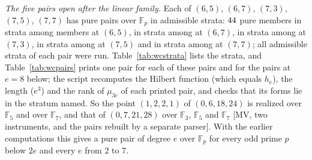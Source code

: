 \documentclass[11pt]{article}
\theoremstyle{definition}
\theoremstyle{remark}
\newcommand{\F}{\mathbb{F}}
\begin{document}
\begin{table}[htbp]
\centering\scriptsize

\caption{The search in the weight-class strata: family C (controls on settled pairs), Q (the five open pairs $(6,5)$, $(6,7)$, $(7,3)$, $(7,5)$, $(7,7)$) and E ($e=8$, exploratory); for each pair the number of strata stored, with a member of rank $r$ and with a pure member, the members examined, with $\operatorname{rank}\mu_{3e}=r$, with the pure Hilbert function, the Betti tables computed and the pure ones, and the share of the pure Hilbert function in $S(2;0,1)$ (the number of such members among the members examined) with its ratio to $p^{-h_e(3e)}$.}
\label{tab:wcounts}
\end{table}

\emph{The five pairs open after the linear family.} Each of $(6,5)$, $(6,7)$, $(7,3)$, $(7,5)$, $(7,7)$ has pure pairs over $\F_p$ in admissible strata: $44$ pure members in \nwcQSixFiveStrataPure{} strata among \nwcQSixFiveExamined{} members at $(6,5)$, \nwcQSixSevenPure{} in \nwcQSixSevenStrataPure{} strata among \nwcQSixSevenExamined{} at $(6,7)$, \nwcQSevenThreePure{} in \nwcQSevenThreeStrataPure{} strata among \nwcQSevenThreeExamined{} at $(7,3)$, \nwcQSevenFivePure{} in \nwcQSevenFiveStrataPure{} strata among \nwcQSevenFiveExamined{} at $(7,5)$ and \nwcQSevenSevenPure{} in \nwcQSevenSevenStrataPure{} strata among \nwcQSevenSevenExamined{} at $(7,7)$; all admissible strata of each pair were run. Table~\ref{tab:wcstrata} lists the strata, and Table~\ref{tab:wcpairs} prints one pair for each of these pairs and for the pairs at $e=8$ below; the script recomputes the Hilbert function (which equals $h_e$), the length ($e^3$) and the rank of $\mu_{3e}$ of each printed pair, and checks that its forms lie in the stratum named. So the point $(1,2,2,1)$ of $(0,6,18,24)$ is realized over $\F_5$ and over $\F_7$, and that of $(0,7,21,28)$ over $\F_3$, $\F_5$ and $\F_7$ [MV, two instruments, and the pairs rebuilt by a separate parser]. With the earlier computations this gives a pure pair of degree $e$ over $\F_p$ for every odd prime $p$ below $2e$ and every $e$ from $2$ to $7$.

\begin{table}[htbp]
\centering\footnotesize

\caption{For each pair examined by the search in the strata (the settled pairs of family C are not listed), the strata in which a pure member was found, with the number of pure members of each; at $(6,11)$ and the other settled pairs of family C the strata of the linear family hold the members of Table~\ref{tab:lfampairs}.}
\label{tab:wcstrata}
\end{table}
\end{document}
